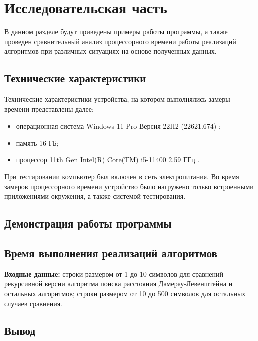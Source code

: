\chapter{Исследовательская часть}

В данном разделе будут приведены примеры работы программы, а также проведен сравнительный анализ процессорного времени работы реализаций алгоритмов при различных ситуациях на основе полученных данных.

\section{Технические характеристики}

Технические характеристики устройства, на котором выполнялись замеры времени представлены далее:

\begin{itemize}
	\item операционная система Windows 11 Pro Версия 22H2 (22621.674) \cite{wind};
	\item память 16 ГБ;
	\item процессор 11th Gen Intel(R) Core(TM) i5-11400 2.59 ГГц \cite{proc}.
\end{itemize}

При тестировании компьютер был включен в сеть электропитания. Во время замеров процессорного времени устройство было нагружено только встроенными приложениями окружения, а также системой тестирования.

\section{Демонстрация работы программы}

%

\section{Время выполнения реализаций алгоритмов}

\textbf{Входные данные:} строки размером от 1 до 10 символов для сравнений рекурсивной версии алгоритма поиска расстояния Дамерау-Левенштейна и остальных алгоритмов; строки размером от 10 до 500 символов для остальных случаев сравнения.



\section{Вывод}
